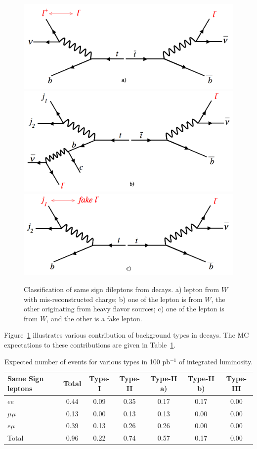 \begin{figure}[htb]
\begin{center}
\includegraphics[width=0.32\linewidth, height=0.2\linewidth]{figs/feyntypeI.png}
\includegraphics[width=0.32\linewidth, height=0.2\linewidth]{figs/feyntypeIIa.png}
\includegraphics[width=0.32\linewidth, height=0.2\linewidth]{figs/feyntypeIIb.png}
\caption{ Classification of same sign dileptons from \ttbar decays. a) lepton from $W$ with mis-reconstructed charge; 
b) one of the lepton is from $W$, the other originating from heavy flavor sources; c) one of the lepton is from $W$,
and the other is a fake lepton. \label{fig:fakeOrigin}}
\end{center}
\end{figure}

Figure~\ref{fig:fakeOrigin} illustrates various contribution of background types in \ttbar decays. The MC 
expectations to these contributions are given in Table~\ref{tab:fakeOrigin}.

\begin{table}[hbt]
\begin{center}
\begin{tabular}{|l|c|c|c|c|c|c|}\hline
Same Sign leptons & Total & 	 Type-I &  Type-II & Type-II a) & Type-II b) & Type-III \\ \hline
$ee$ &	0.44 &	0.09 &	0.35 &	0.17 &	0.17 &	0.00 \\
$\mu \mu$ & 	0.13 &	0.00 &	0.13 &	0.13 &	0.00 &	0.00 \\
$e\mu$ &	0.39 &	0.13 &	0.26 &	0.26 &	0.00 &	0.00 \\
Total &	0.96 &	0.22 &	0.74 &	0.57 &	0.17 &	0.00 \\
\hline
\end{tabular}
\caption{ Expected number of \ttbar events for various types in 100 pb$^{-1}$ of integrated luminosity.\label{tab:fakeOrigin}}
\end{center}
\end{table}

